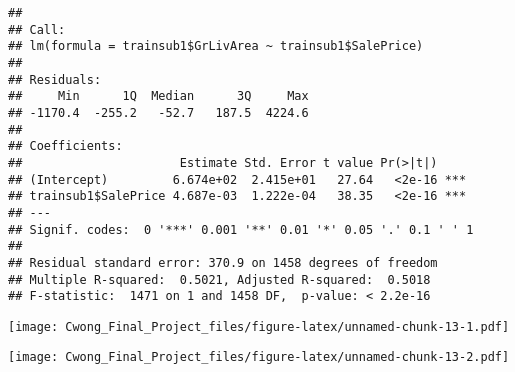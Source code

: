 \documentclass[]{article}
\newenvironment{Shaded}{\begin{snugshade}}{\end{snugshade}}
\newcommand{\KeywordTok}[1]{\textcolor[rgb]{0.13,0.29,0.53}{\textbf{#1}}}
\newcommand{\DataTypeTok}[1]{\textcolor[rgb]{0.13,0.29,0.53}{#1}}
\newcommand{\StringTok}[1]{\textcolor[rgb]{0.31,0.60,0.02}{#1}}
\newcommand{\OperatorTok}[1]{\textcolor[rgb]{0.81,0.36,0.00}{\textbf{#1}}}
\newcommand{\NormalTok}[1]{#1}
\begin{document}
\begin{Shaded}
\end{Shaded}

\begin{verbatim}
## 
## Call:
## lm(formula = trainsub1$GrLivArea ~ trainsub1$SalePrice)
## 
## Residuals:
##     Min      1Q  Median      3Q     Max 
## -1170.4  -255.2   -52.7   187.5  4224.6 
## 
## Coefficients:
##                      Estimate Std. Error t value Pr(>|t|)    
## (Intercept)         6.674e+02  2.415e+01   27.64   <2e-16 ***
## trainsub1$SalePrice 4.687e-03  1.222e-04   38.35   <2e-16 ***
## ---
## Signif. codes:  0 '***' 0.001 '**' 0.01 '*' 0.05 '.' 0.1 ' ' 1
## 
## Residual standard error: 370.9 on 1458 degrees of freedom
## Multiple R-squared:  0.5021, Adjusted R-squared:  0.5018 
## F-statistic:  1471 on 1 and 1458 DF,  p-value: < 2.2e-16
\end{verbatim}

\begin{Shaded}
\end{Shaded}

\texttt{[image: Cwong\_Final\_Project\_files/figure-latex/unnamed-chunk-13-1.pdf]}

\begin{Shaded}
\end{Shaded}

\texttt{[image: Cwong\_Final\_Project\_files/figure-latex/unnamed-chunk-13-2.pdf]}
\end{document}
